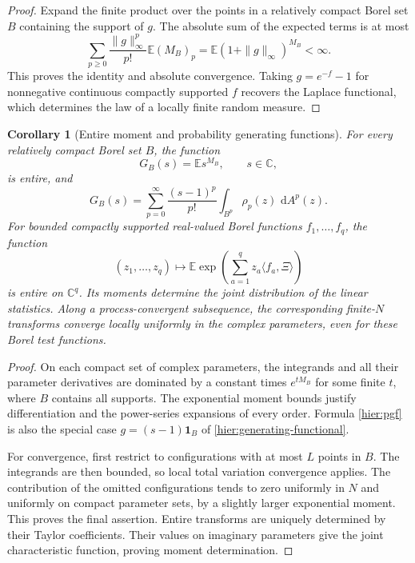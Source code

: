 \documentclass[11pt,a4paper]{article}
\numberwithin{equation}{section}
\newtheorem{corollary}[theorem]{Corollary}
\theoremstyle{definition}
\theoremstyle{remark}
\newcommand{\E}{\mathbb E}
\newcommand{\C}{\mathbb C}
\newcommand{\dd}{\,\mathrm d}
\newcommand{\ind}{\mathbf 1}
\begin{document}
\begin{proof}
Expand the finite product over the points in a relatively compact
Borel set $B$ containing the support of $g$.  The absolute sum of
the expected terms is at most
\[
 \sum_{p\ge0}\frac{\|g\|_\infty^p}{p!}\E(M_B)_p
 =\E(1+\|g\|_\infty)^{M_B}<\infty.
\]
This proves the identity and absolute convergence.  Taking
$g=e^{-f}-1$ for nonnegative continuous compactly supported $f$
recovers the Laplace functional, which determines the law of a
locally finite random measure.
\end{proof}

\begin{corollary}[Entire moment and probability generating functions]
\label{cor:hier-entire}
For every relatively compact Borel set $B$, the function
\[
 G_B(s)=\E s^{M_B},\qquad s\in\C,
\]
is entire, and
\begin{equation}
 G_B(s)=\sum_{p=0}^{\infty}\frac{(s-1)^p}{p!}
                        \int_{B^p}\rho_p(z)\,\dd A^p(z).
 \label{hier:pgf}
\end{equation}
For bounded compactly supported real-valued Borel functions
$f_1,\ldots,f_q$, the function
\[
 (z_1,\ldots,z_q)\longmapsto
 \E\exp\left(\sum_{a=1}^qz_a\langle f_a,\Xi\rangle\right)
\]
is entire on $\C^q$.  Its moments determine the joint distribution
of the linear statistics.  Along a process-convergent subsequence, the corresponding
finite-$N$ transforms converge locally uniformly in the complex
parameters, even for these Borel test functions.
\end{corollary}

\begin{proof}
On each compact set of complex parameters, the integrands and all
their parameter derivatives are dominated by a constant times
$e^{tM_B}$ for some finite $t$, where $B$ contains all supports.
The exponential moment bounds justify differentiation and the
power-series expansions of every order.  Formula \eqref{hier:pgf}
is also the special case $g=(s-1)\ind_B$ of
\eqref{hier:generating-functional}.

For convergence, first restrict to configurations with at most
$L$ points in $B$.  The integrands are then bounded, so local total
variation convergence applies.  The contribution of the omitted
configurations tends to zero uniformly in $N$ and uniformly on
compact parameter sets, by a slightly larger exponential moment.
This proves the final assertion.  Entire transforms are uniquely
determined by their Taylor coefficients.  Their values on imaginary
parameters give the joint characteristic function, proving moment
determination.
\end{proof}
\end{document}
